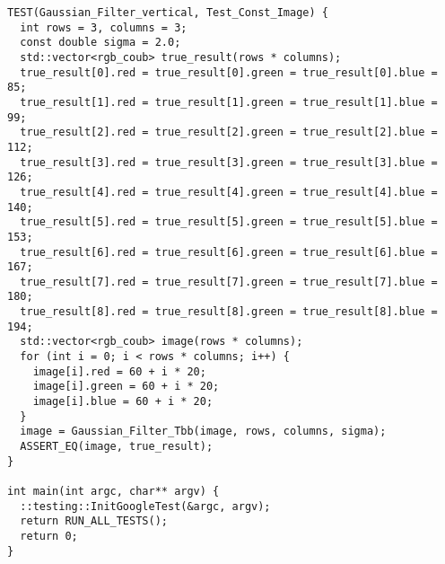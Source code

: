 \documentclass{report}
\begin{document}
\begin{lstlisting}
TEST(Gaussian_Filter_vertical, Test_Const_Image) {
  int rows = 3, columns = 3;
  const double sigma = 2.0;
  std::vector<rgb_coub> true_result(rows * columns);
  true_result[0].red = true_result[0].green = true_result[0].blue = 85;
  true_result[1].red = true_result[1].green = true_result[1].blue = 99;
  true_result[2].red = true_result[2].green = true_result[2].blue = 112;
  true_result[3].red = true_result[3].green = true_result[3].blue = 126;
  true_result[4].red = true_result[4].green = true_result[4].blue = 140;
  true_result[5].red = true_result[5].green = true_result[5].blue = 153;
  true_result[6].red = true_result[6].green = true_result[6].blue = 167;
  true_result[7].red = true_result[7].green = true_result[7].blue = 180;
  true_result[8].red = true_result[8].green = true_result[8].blue = 194;
  std::vector<rgb_coub> image(rows * columns);
  for (int i = 0; i < rows * columns; i++) {
    image[i].red = 60 + i * 20;
    image[i].green = 60 + i * 20;
    image[i].blue = 60 + i * 20;
  }
  image = Gaussian_Filter_Tbb(image, rows, columns, sigma);
  ASSERT_EQ(image, true_result);
}

int main(int argc, char** argv) {
  ::testing::InitGoogleTest(&argc, argv);
  return RUN_ALL_TESTS();
  return 0;
}

\end{lstlisting}
\end{document}
